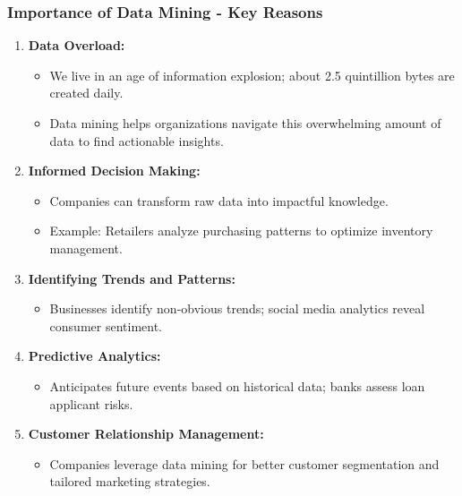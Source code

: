 \documentclass{beamer}
\begin{document}
\begin{frame}[fragile]
    \frametitle{Importance of Data Mining - Key Reasons}
    \begin{enumerate}
        \item \textbf{Data Overload:}
            \begin{itemize}
                \item We live in an age of information explosion; about 2.5 quintillion bytes are created daily.
                \item Data mining helps organizations navigate this overwhelming amount of data to find actionable insights.
            \end{itemize}
        \item \textbf{Informed Decision Making:}
            \begin{itemize}
                \item Companies can transform raw data into impactful knowledge.
                \item Example: Retailers analyze purchasing patterns to optimize inventory management.
            \end{itemize}
        \item \textbf{Identifying Trends and Patterns:}
            \begin{itemize}
                \item Businesses identify non-obvious trends; social media analytics reveal consumer sentiment.
            \end{itemize}
        \item \textbf{Predictive Analytics:}
            \begin{itemize}
                \item Anticipates future events based on historical data; banks assess loan applicant risks.
            \end{itemize}
        \item \textbf{Customer Relationship Management:}
            \begin{itemize}
                \item Companies leverage data mining for better customer segmentation and tailored marketing strategies.
            \end{itemize}
    \end{enumerate}
\end{frame}
\end{document}
